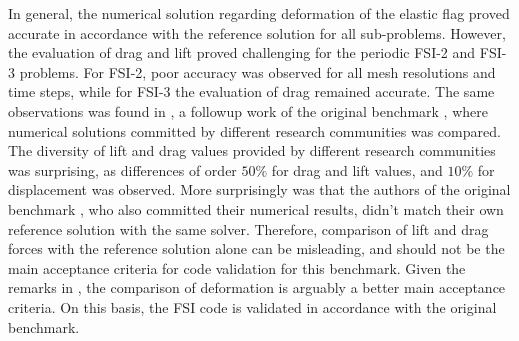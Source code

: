 In general, the numerical solution regarding deformation of the elastic flag proved accurate in accordance with the reference solution for all sub-problems. However, the evaluation of drag and lift proved challenging for the periodic FSI-2 and FSI-3 problems. For FSI-2, poor accuracy was observed for all mesh resolutions and time steps, while for FSI-3 the evaluation of drag remained accurate. The same observations was found in \cite{Turek}, a followup work of the original benchmark \cite{Hron2006}, where numerical solutions committed by different research communities was compared. The diversity of lift and drag values provided by different research communities was surprising, as differences of order $50\%$ for drag and lift values, and $10\%$ for displacement was observed. More surprisingly was that the authors of the original benchmark \cite{Hron2006}, who also committed their numerical results, didn't match their own reference solution with the same solver. Therefore,  comparison of lift and drag forces with the reference solution alone can be misleading, and should not be the main acceptance criteria for code validation for this benchmark. Given the remarks in \cite{Turek}, the comparison of deformation is arguably a better main acceptance criteria. On this basis, the FSI code is validated in accordance with the original benchmark.  \\








 

